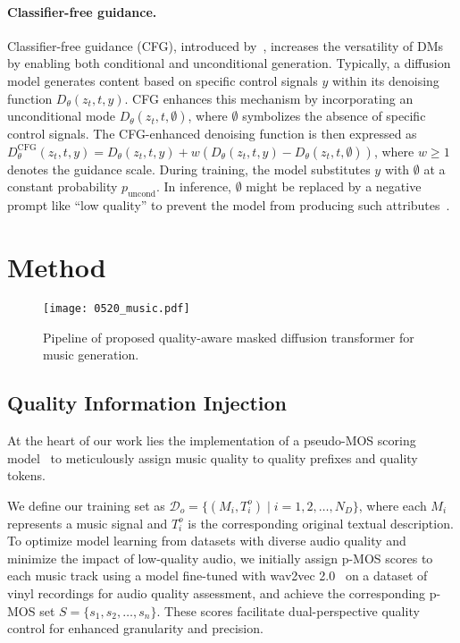 \paragraph{Classifier-free guidance.}
Classifier-free guidance (CFG), introduced by~\citep{ho2020denoising}, increases the versatility of DMs by enabling both conditional and unconditional generation. Typically, a diffusion model generates content based on specific control signals \( y \) within its denoising function \( D_{\theta}(z_t, t, y) \). CFG enhances this mechanism by incorporating an unconditional mode \( D_{\theta}(z_t, t, \emptyset) \), where \( \emptyset \) symbolizes the absence of specific control signals. The CFG-enhanced denoising function is then expressed as \( D_{\theta}^{\text{CFG}}(z_t, t, y) = D_{\theta}(z_t, t, y) + w(D_{\theta}(z_t, t, y) - D_{\theta}(z_t, t, \emptyset)) \), where \( w \geq 1 \) denotes the guidance scale.
During training, the model substitutes \( y \) with \( \emptyset \) at a constant probability \( p_{\text{uncond}} \). In inference, \( \emptyset \) might be replaced by a negative prompt like ``low quality'' to prevent the model from producing such attributes~\citep{liu2023audioldm2}.

\section{Method}\label{sec:method}

\begin{figure*}[t]
    \centering
    \texttt{[image: 0520\_music.pdf]}
    \caption{Pipeline of proposed quality-aware masked diffusion transformer for music generation.}
    \label{fig:kuangjia}
\end{figure*}

\subsection{Quality Information Injection}
\label{quality_informaton_injection}
At the heart of our work lies the implementation of a pseudo-MOS scoring model~\citep{ragano2023audio} to meticulously assign music quality to quality prefixes and quality tokens. 

We define our training set as \(\mathcal{D}_o = \{(M_i, T^{o}_i) \mid i = 1, 2, \dots, N_D\}\), where each \(M_i\) represents a music signal and \(T^{o}_i\) is the corresponding original textual description.
To optimize model learning from datasets with diverse audio quality and minimize the impact of low-quality audio, we initially assign p-MOS scores to each music track using a model fine-tuned with wav2vec 2.0~\citep{baevski2020wav2vec} on a dataset of vinyl recordings for audio quality assessment, and achieve the corresponding p-MOS set \( S = \{s_1, s_2, \ldots, s_n\} \). These scores facilitate dual-perspective quality control for enhanced granularity and precision. 

